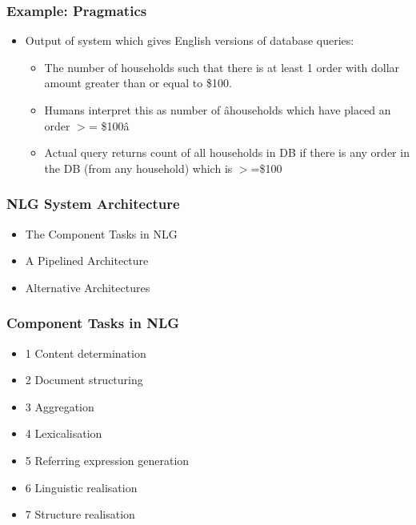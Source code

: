 \documentclass[compress,color=usenames]{beamer}
\begin{document}
\begin{frame}
\frametitle{Example: Pragmatics}

\label{f50}
\begin{itemize}
\item { {Output of system which gives English versions of database queries:}}
\begin{itemize}
\item The number of households such that there is at least 1 order with dollar amount greater than or equal to \$100.
\item Humans interpret this as number of \^ahouseholds which have placed an order \mbox{$>$}= \$100\^a
\item Actual query returns count of all households in DB if there is any order in the DB (from any household) which is \mbox{$>$}=\$100
\end{itemize}
\end{itemize}

\end{frame}

\begin{frame}
\frametitle{NLG System Architecture}

\label{f52}
\begin{itemize}
\item { {The Component Tasks in NLG}}
\item { {A Pipelined Architecture}}
\item { {Alternative Architectures}}
\end{itemize}

\end{frame}

\begin{frame}
\frametitle{Component Tasks in NLG}

\label{f54}
\begin{itemize}
\item { {1 Content determination}}
\item { {2 Document structuring}}
\item { {3 Aggregation}}
\item { {4 Lexicalisation}}
\item { {5 Referring expression generation}}
\item { {6 Linguistic realisation}}
\item { {7 Structure realisation}}
\end{itemize}

\end{frame}
\end{document}
